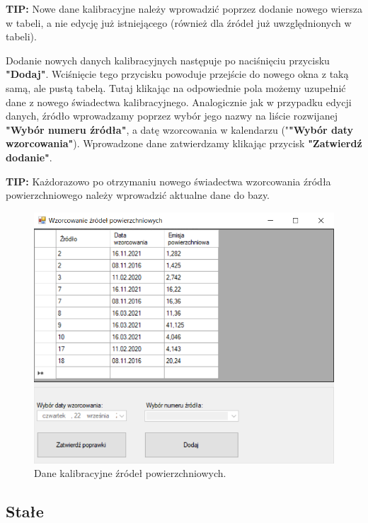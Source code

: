 \textbf{TIP:} Nowe dane kalibracyjne należy wprowadzić poprzez dodanie nowego wiersza w tabeli, a nie edycję już istniejącego (również dla źródeł już uwzględnionych w tabeli).

Dodanie nowych danych kalibracyjnych następuje po naciśnięciu przycisku \textbf{"Dodaj"}. Wciśnięcie tego przycisku powoduje przejście do nowego okna z taką samą, ale pustą tabelą. Tutaj klikając na odpowiednie pola możemy uzupełnić dane z nowego świadectwa kalibracyjnego. Analogicznie jak w przypadku edycji danych, źródło wprowadzamy poprzez wybór jego nazwy na liście rozwijanej \textbf{"Wybór numeru źródła"}, a datę wzorcowania w kalendarzu ("\textbf{"Wybór daty wzorcowania"}). Wprowadzone dane zatwierdzamy klikając przycisk \textbf{"Zatwierdź dodanie"}.

\textbf{TIP:} Każdorazowo po otrzymaniu nowego świadectwa wzorcowania źródła powierzchniowego należy wprowadzić aktualne dane do bazy.

\begin{figure}[htb]
	\centering
	\includegraphics{obrazki/Ustawienia/wzorcowanie_zrodel_powierzchniowych.png}
	\caption{Dane kalibracyjne źródeł powierzchniowych.}
	\label{wzorcowanieZrodelPowierzchniowych}
\end{figure}

\subsection{Stałe}
\label{stale}

